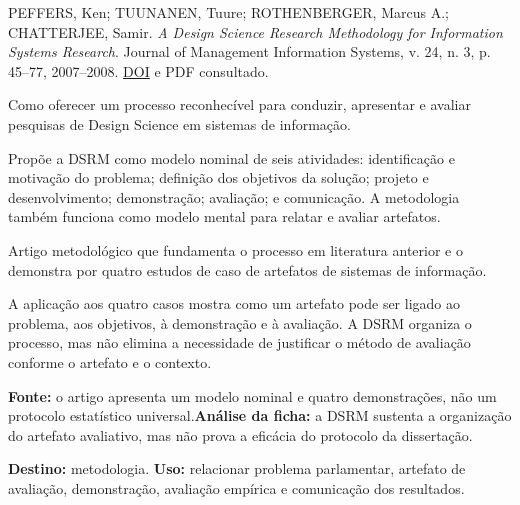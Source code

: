 {\small PEFFERS, Ken; TUUNANEN, Tuure; ROTHENBERGER, Marcus A.; CHATTERJEE, Samir. \textit{A Design Science Research Methodology for Information Systems Research}. Journal of Management Information Systems, v. 24, n. 3, p. 45--77, 2007--2008. \href{https://doi.org/10.2753/MIS0742-1222240302}{DOI} e PDF consultado.\par}

Como oferecer um processo reconhecível para conduzir, apresentar e avaliar pesquisas de Design Science em sistemas de informação.

Propõe a DSRM como modelo nominal de seis atividades: identificação e motivação do problema; definição dos objetivos da solução; projeto e desenvolvimento; demonstração; avaliação; e comunicação. A metodologia também funciona como modelo mental para relatar e avaliar artefatos.

Artigo metodológico que fundamenta o processo em literatura anterior e o demonstra por quatro estudos de caso de artefatos de sistemas de informação.

A aplicação aos quatro casos mostra como um artefato pode ser ligado ao problema, aos objetivos, à demonstração e à avaliação. A DSRM organiza o processo, mas não elimina a necessidade de justificar o método de avaliação conforme o artefato e o contexto.

\begin{itemize}
\end{itemize}

\textbf{Fonte:} o artigo apresenta um modelo nominal e quatro demonstrações, não um protocolo estatístico universal.\textbf{Análise da ficha:} a DSRM sustenta a organização do artefato avaliativo, mas não prova a eficácia do protocolo da dissertação.

\textbf{Destino:} metodologia. \textbf{Uso:} relacionar problema parlamentar, artefato de avaliação, demonstração, avaliação empírica e comunicação dos resultados.

